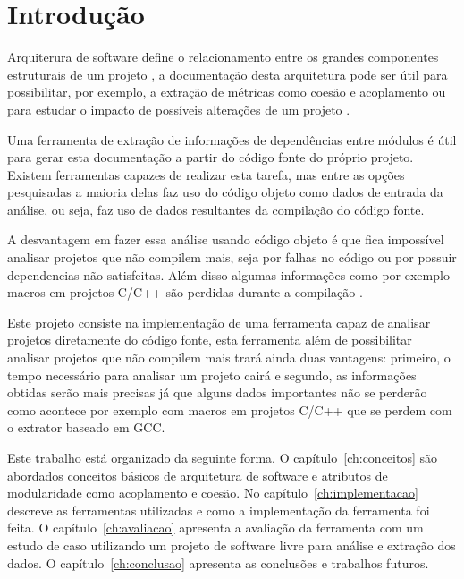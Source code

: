 \chapter{Introdução}

Arquiterura de software define o relacionamento entre os grandes componentes
estruturais de um projeto \cite{EngenhariaDeSoftwarePressman}, a documentação
desta arquitetura pode ser útil para possibilitar, por exemplo, a extração de métricas
como coesão e acoplamento ou para estudar o impacto de possíveis alterações
de um projeto \cite{mata26-terceiro-projeto-piloto}.

Uma ferramenta de extração de informações de dependências entre módulos é útil
para gerar esta documentação a partir do código fonte do próprio projeto.
Existem ferramentas capazes de realizar esta tarefa, mas entre as opções
pesquisadas \cite{SourceVersusObjectCodeExtraction} a maioria delas faz uso do
código objeto como dados de entrada da análise, ou seja, faz uso de dados
resultantes da compilação do código fonte.

A desvantagem em fazer essa análise usando código objeto é que fica impossível
analisar projetos que não compilem mais, seja por falhas no código ou por
possuir dependencias não satisfeitas. Além disso algumas informações como por
exemplo macros em projetos C/C++ são perdidas durante a
compilação \cite{SourceVersusObjectCodeExtraction}.

Este projeto consiste na implementação de uma ferramenta capaz de analisar
projetos diretamente do código fonte, esta
ferramenta além de possibilitar analisar projetos que não compilem mais trará
ainda duas vantagens: primeiro, o tempo necessário para analisar um projeto
cairá e segundo, as informações obtidas serão mais precisas já que alguns dados
importantes não se perderão como acontece por exemplo com macros em projetos
C/C++ \cite{SourceVersusObjectCodeExtraction} que se perdem com o extrator
baseado em GCC.


Este trabalho está organizado da seguinte forma. O capítulo~\ref{ch:conceitos}
são abordados conceitos básicos de arquitetura de software e atributos de
modularidade como acoplamento e coesão. No capítulo~\ref{ch:implementacao}
descreve as ferramentas utilizadas e como a implementação da ferramenta foi
feita. O capítulo~\ref{ch:avaliacao} apresenta a avaliação da ferramenta com um
estudo de caso utilizando um projeto de software livre para análise e extração
dos dados. O capítulo~\ref{ch:conclusao} apresenta as conclusões e trabalhos
futuros.

